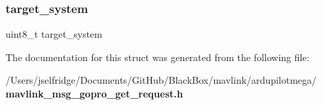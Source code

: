 \mbox{\label{struct____mavlink__gopro__get__request__t_ac9afff43526a157e4c4e45607c1418b8}} 
\subsubsection{target\+\_\+system}
{\footnotesize\ttfamily uint8\+\_\+t target\+\_\+system}



The documentation for this struct was generated from the following file\+:\begin{DoxyCompactItemize}
\item 
/\+Users/jselfridge/\+Documents/\+Git\+Hub/\+Black\+Box/mavlink/ardupilotmega/\textbf{ mavlink\+\_\+msg\+\_\+gopro\+\_\+get\+\_\+request.\+h}\end{DoxyCompactItemize}
